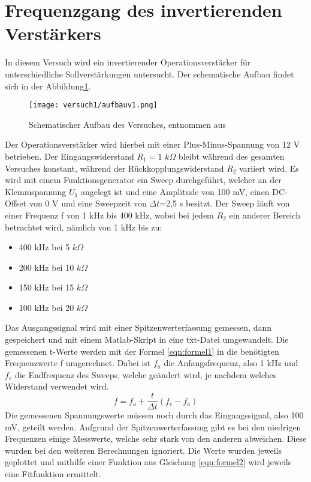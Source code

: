 \section{Frequenzgang des invertierenden Verstärkers}
In diesem Versuch wird ein invertierender Operationsverstärker  für unterschiedliche Sollverstärkungen untersucht. Der schematische Aufbau findet sich in der Abbildung\ref{fig:aufbau1}.
\begin{figure}[h]
    \centering
    \texttt{[image: versuch1/aufbauv1.png]}
    \caption{Schematischer Aufbau des Versuches, entnommen aus \cite{script}}
    \label{fig:aufbau1}
\end{figure}
Der Operationsverstärker wird hierbei mit einer Plus-Minus-Spannung von 12 V betrieben. Der Eingangswiderstand $R_1=1$ $k\Omega$ bleibt während des gesamten Versuches konstant, während der Rückkopplungswiderstand $R_2$ variiert wird. Es wird mit einem Funktionsgenerator ein Sweep durchgeführt, welcher an der Klemmspannung $U_1$ angelegt ist und eine Amplitude von 100 mV, einen DC-Offset von 0 V und eine Sweepzeit von $\Delta t$=2,5 s besitzt. Der Sweep läuft von einer Frequenz f von 1 kHz bis 400 kHz, wobei bei jedem $R_2$ ein anderer Bereich betrachtet wird, nämlich von 1 kHz bis zu:
\begin{itemize}[noitemsep,nosep]
	\item 400 kHz bei 5 $k\Omega$
	\item 200 kHz bei 10 $k\Omega$
	\item 150 kHz bei 15 $k\Omega$
	\item 100 kHz bei 20 $k\Omega$
\end{itemize}
Das Ausgangssignal wird mit einer Spitzenwerterfassung gemessen, dann gespeichert und mit einem Matlab-Skript in eine txt-Datei umgewandelt. Die gemessenen t-Werte werden mit der Formel \ref{eqn:formel1} in die benötigten Frequenzwerte f umgerechnet. Dabei ist $f_a$ die Anfangsfrequenz, also 1 kHz und $f_e$ die Endfrequenz des Sweeps, welche geändert wird, je nachdem welches Widerstand verwendet wird.
\begin{equation}\label{eqn:formel1}
    f=f_a+\frac{t}{\Delta t}(f_e-f_a)
\end{equation}
Die gemessenen Spannungswerte müssen noch durch das Eingangssignal, also 100 mV, geteilt werden. Aufgrund der Spitzenwerterfassung gibt es bei den niedrigen Frequenzen einige Messwerte, welche sehr stark von den anderen abweichen. Diese wurden bei den weiteren Berechnungen ignoriert. Die Werte wurden jeweils geplottet und mithilfe einer Funktion aus Gleichung \ref{eqn:formel2} wird jeweils eine Fitfunktion ermittelt.
